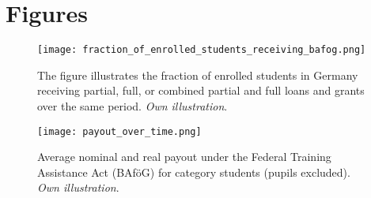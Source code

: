 \newpage
\section{Figures}
\renewcommand{\thefigure}{\thesection \arabic{figure}}
\setcounter{figure}{0}


\begin{figure}[H]
  \centering

  \begin{minipage}[t]{0.48\textwidth}
    \centering
    \texttt{[image: fraction\_of\_enrolled\_students\_receiving\_bafog.png]}
    \caption{
      The figure illustrates the fraction of enrolled students in Germany receiving partial, full, or combined partial and full loans and grants over the same period. \textit{Own illustration}.
    }
  \label{figure:bafoeg_support}
  \end{minipage}%
  \hfill
  \begin{minipage}[t]{0.48\textwidth}
    \centering
    \texttt{[image: payout\_over\_time.png]}
    \caption{Average nominal and real payout under the Federal Training Assistance Act (BAföG) for category students (pupils excluded). \textit{Own illustration}.}
  \label{figure:payout_over_time}
  \end{minipage}

\end{figure}
